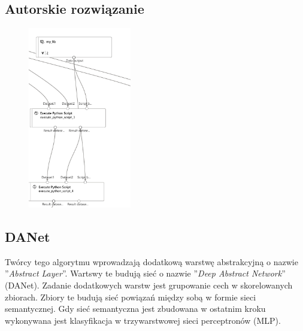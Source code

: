 \subsection{Autorskie rozwiązanie}
\begin{figure}[H]
    \centering
    \includegraphics[width=0.4\textwidth]{images/ga_pipe}
    \label{fig:ga-pipe}
\end{figure}

\subsection{DANet}
Twórcy tego algorytmu wprowadzają dodatkową warstwę abstrakcyjną o nazwie ''\textit{Abstract Layer}''. Wartswy te budują sieć o nazwie ''\textit{Deep Abstract Network}'' (DANet). Zadanie dodatkowych warstw jest grupowanie cech w skorelowanych zbiorach. Zbiory te budują sieć powiązań między sobą w formie sieci semantycznej. Gdy sieć semantyczna jest zbudowana w ostatnim kroku wykonywana jest klasyfikacja w trzywarstwowej sieci perceptronów  (MLP)\cite{Chen2022, Danet}.


